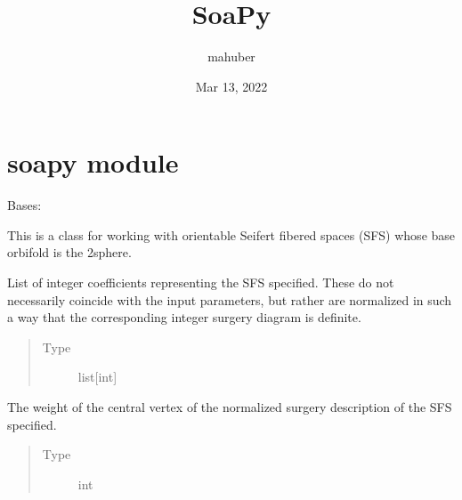 \documentclass[letterpaper,10pt,english]{sphinxmanual}
\title{SoaPy}
\date{Mar 13, 2022}
\author{m\sphinxhyphen{}a\sphinxhyphen{}huber}
\begin{document}
\pagestyle{empty}
\sphinxmaketitle
\pagestyle{plain}
\sphinxtableofcontents
\pagestyle{normal}
\label{\detokenize{index::doc}}



\chapter{soapy module}
\label{\detokenize{soapy:module-soapy}}\label{\detokenize{soapy:soapy-module}}\label{\detokenize{soapy::doc}}

\begin{fulllineitems}
\label{\detokenize{soapy:soapy.SFS}}
\sphinxAtStartPar
Bases: 

\sphinxAtStartPar
This is a class for working with orientable Seifert fibered spaces (SFS) whose base orbifold is the 2\sphinxhyphen{}sphere.

\begin{fulllineitems}
\label{\detokenize{soapy:soapy.SFS.params}}
\sphinxAtStartPar
List of integer coefficients representing the SFS specified. These do not necessarily coincide with the input parameters, but rather are normalized in such a way that the corresponding integer surgery diagram is definite.
\begin{quote}\begin{description}
\item[{Type}] \leavevmode
\sphinxAtStartPar
list{[}int{]}

\end{description}\end{quote}

\end{fulllineitems}


\begin{fulllineitems}
\label{\detokenize{soapy:soapy.SFS.central_weight}}
\sphinxAtStartPar
The weight of the central vertex of the normalized surgery description of the SFS specified.
\begin{quote}\begin{description}
\item[{Type}] \leavevmode
\sphinxAtStartPar
int


\end{description}
\end{quote}
\end{fulllineitems}
\end{fulllineitems}
\end{document}
